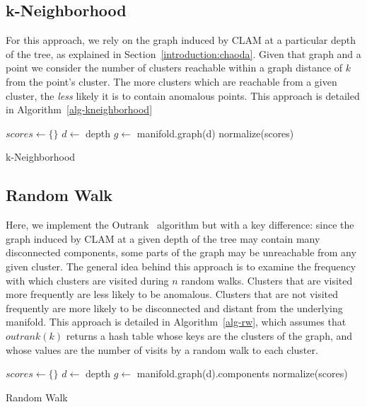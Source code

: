 \subsection{k-Neighborhood}

For this approach, we rely on the graph induced by CLAM at a particular depth of the tree, as explained in Section~\ref{introduction:chaoda}.
Given that graph and a point we consider the number of clusters reachable within a graph distance of $k$ from the point's cluster.
The more clusters which are reachable from a given cluster, the \textit{less} likely it is to contain anomalous points.
This approach is detailed in Algorithm~\ref{alg-kneighborhood}

\begin{algorithm}
\DontPrintSemicolon
\SetAlgoLined
{}
 $scores \leftarrow \{\}$\;
 $d \leftarrow $ depth\;
 $g \leftarrow $ manifold.graph(d)\;
 normalize(scores)\;
 \caption{k-Neighborhood}
 \label{alg-kneighborhood}
\end{algorithm}

\subsection{Random Walk}

Here, we implement the Outrank~\cite{moonesinghe2008outrank} algorithm but with a key difference: since the graph induced by CLAM at a given depth of the tree may contain many disconnected components, some parts of the graph may be unreachable from any given cluster.
The general idea behind this approach is to examine the frequency with which clusters are visited during $n$ random walks.
Clusters that are visited more frequently are less likely to be anomalous.
Clusters that are not visited frequently are more likely to be disconnected and distant from the underlying manifold.
This approach is detailed in Algorithm~\ref{alg-rw}, which assumes that $outrank(k)$ returns a hash table whose keys are the clusters of the graph, and whose values are the number of visits by a random walk to each cluster.

\begin{algorithm}
\DontPrintSemicolon
\SetAlgoLined
{}
 $scores \leftarrow \{\}$\;
 $d \leftarrow $ depth\;
 $g \leftarrow $ manifold.graph(d).components\;
 normalize(scores)\;
 \caption{Random Walk}
 \label{alg-rw}
\end{algorithm}

